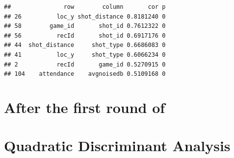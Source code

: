 \documentclass[]{article}
\begin{document}
\begin{verbatim}
##               row        column       cor p
## 26          loc_y shot_distance 0.8181240 0
## 58        game_id       shot_id 0.7612322 0
## 56          recId       shot_id 0.6917176 0
## 44  shot_distance     shot_type 0.6686083 0
## 41          loc_y     shot_type 0.6066234 0
## 2           recId       game_id 0.5270915 0
## 104    attendance    avgnoisedb 0.5109168 0
\end{verbatim}

\hypertarget{after-the-first-round-of}{%
\section{After the first round of}\label{after-the-first-round-of}}

\hypertarget{quadratic-discriminant-analysis}{%
\section{\texorpdfstring{\textbf{Quadratic Discriminant
Analysis}}{Quadratic Discriminant Analysis}}\label{quadratic-discriminant-analysis}}
\end{document}
